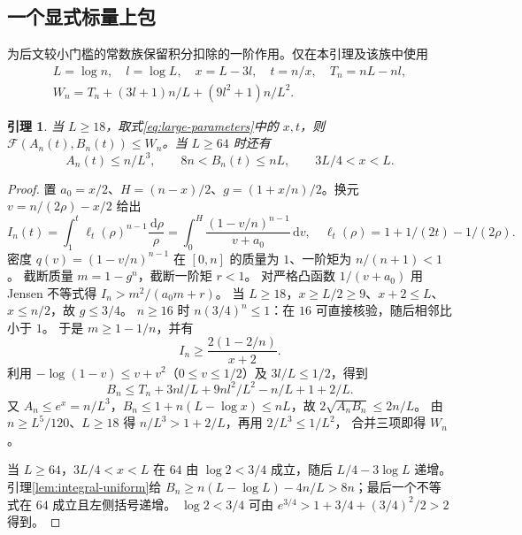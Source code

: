 \documentclass[UTF8,a4paper,11pt,fontset=fandol]{ctexart}
\newtheorem{lemma}{引理}[section]
\theoremstyle{remark}
\newcommand{\dint}{\,\mathrm d}
\newcommand{\Fcal}{\mathcal F}
\begin{document}
\subsection{一个显式标量上包}
为后文较小门槛的常数族保留积分扣除的一阶作用。仅在本引理及该族中使用
\begin{equation}\label{eq:large-parameters}
\begin{gathered}
 L=\log n,\quad l=\log L,\quad x=L-3l,\quad t=n/x,\quad T_n=nL-nl,\\
 W_n=T_n+(3l+1)n/L+(9l^2+1)n/L^2.
\end{gathered}
\end{equation}
\begin{lemma}\label{lem:W}
当 $L\ge18$，取式\eqref{eq:large-parameters}中的 $x,t$，则
$\Fcal(A_n(t),B_n(t))\le W_n$。当 $L\ge64$ 时还有
\begin{equation}\label{eq:AB-bounds}
 A_n(t)\le n/L^3,\qquad 8n<B_n(t)\le nL,\qquad 3L/4<x<L.
\end{equation}
\end{lemma}
\begin{proof}
置 $a_0=x/2$、$H=(n-x)/2$、$g=(1+x/n)/2$。换元
$v=n/(2\rho)-x/2$ 给出
\[
 I_n(t)=\int_1^t\ell_t(\rho)^{n-1}\frac{\dint\rho}{\rho}
 =\int_0^H\frac{(1-v/n)^{n-1}}{v+a_0}\dint v,
 \quad\ell_t(\rho)=1+1/(2t)-1/(2\rho).
\]
密度 $q(v)=(1-v/n)^{n-1}$ 在 $[0,n]$ 的质量为 $1$、一阶矩为 $n/(n+1)<1$。
截断质量 $m=1-g^n$，截断一阶矩 $r<1$。
对严格凸函数 $1/(v+a_0)$ 用 Jensen 不等式得
$I_n>m^2/(a_0m+r)$。
当 $L\ge18$，$x\ge L/2\ge9$、$x+2\le L$、$x\le n/2$，故 $g\le3/4$。
$n\ge16$ 时 $n(3/4)^n\le1$：在 $16$ 可直接核验，随后相邻比小于 $1$。
于是 $m\ge1-1/n$，并有
\[
 I_n\ge\frac{2(1-2/n)}{x+2}.
\]
利用 $-\log(1-v)\le v+v^2$（$0\le v\le1/2$）及 $3l/L\le1/2$，得到
\[
 B_n\le T_n+3nl/L+9nl^2/L^2-n/L+1+2/L.
\]
又 $A_n\le e^x=n/L^3$，$B_n\le1+n(L-\log x)\le nL$，故
$2\sqrt{A_nB_n}\le2n/L$。
由 $n\ge L^5/120$、$L\ge18$ 得 $n/L^3>1+2/L$，再用 $2/L^3\le1/L^2$，
合并三项即得 $W_n$。

当 $L\ge64$，$3L/4<x<L$ 在 $64$ 由 $\log2<3/4$ 成立，随后 $L/4-3\log L$ 递增。
引理\ref{lem:integral-uniform}给
$B_n\ge n(L-\log L)-4n/L>8n$；最后一个不等式在 $64$ 成立且左侧括号递增。
$\log2<3/4$ 可由 $e^{3/4}>1+3/4+(3/4)^2/2>2$ 得到。
\end{proof}
\end{document}
